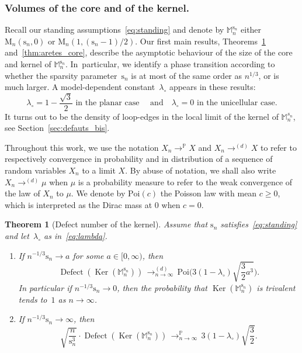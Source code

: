 \documentclass[11pt]{article}
\theoremstyle{plain}
\newtheorem{theorem}{Theorem}
\theoremstyle{definition}
\theoremstyle{remark}
\renewcommand{\P}{\mathbb{P}}
\newcommand{\Map}{\mathrm{M}}
\newcommand{\Mapb}{\mathbb{M}}
\newcommand{\spar}{\mathrm{s}}
\DeclareMathOperator{\Ker}{Ker}
\DeclareMathOperator{\Defect}{Defect}
\newcommand{\cvloi}[1][n]{\,\mathop{\longrightarrow}^{(d)}_{#1 \to \infty}\,}
\newcommand{\cvproba}[1][n]{\,\mathop{\longrightarrow}^{\P}_{#1 \to \infty}\,}
\begin{document}
\subsubsection*{Volumes of the core and of the kernel.}
Recall our standing assumptions~\eqref{eq:standing} and denote by $ \Mapb_{n}^{\spar_{n}}$ either $ \Map_{n}(\spar_{n},0)$ or $ \Map_{n}(1,(\spar_{n}-1)/2)$. Our first main results, Theorems~\ref{thm:defauts_ker} and~\ref{thm:aretes_core}, describe the asymptotic behaviour of the size of the core and kernel of $ \Mapb_{n}^{\spar_{n}}$. In~particular, we identify a phase transition according to whether the sparsity parameter~$\spar_{n}$ is at most of the same order as $n^{1/3}$, or is much larger.
A model-dependent constant~$\lambda_\circ$ appears in these results:
\begin{equation}\label{eq:lambda}
\lambda_\circ = 1-\frac{\sqrt{3}}{2}\text{ in the planar case }
\quad\text{and}\quad
\lambda_\circ = 0\text{ in the unicellular case}.
\end{equation}
It turns out to be the density of loop-edges in the local limit of the kernel of $ \Mapb_n^{s_n}$, see Section~\ref{sec:defauts_bis}.

Throughout this work, we use the notation $X_n \displaystyle\mathop{\to}^\P X$ and $X_n \displaystyle\mathop{\to}^{(d)} X$ to refer to respectively convergence in probability and in distribution of a sequence of random variables $X_n$ to a limit $X$. By abuse of notation, we shall also write $X_n \displaystyle\mathop{\to}^{(d)} \mu$ when $\mu$ is a probability measure to refer to the weak convergence of the law of $X_n$ to $\mu$.
We denote by $\mathrm{Poi}(c)$ the Poisson law with mean $c \ge 0$, which is interpreted as the Dirac mass at $0$ when $c=0$.

\begin{theorem}[Defect number of the kernel]
\label{thm:defauts_ker}
Assume that $\spar_n$ satisfies~\eqref{eq:standing} and let~$\lambda_\circ$ as in~\eqref{eq:lambda}.
\begin{enumerate}
\item\label{thm:defauts_ker-Poisson} If $n^{-1/3} \spar_n \to a$ for some $a \in [0,\infty)$, then
\[
\Defect(\Ker(\Mapb_n^{\spar_{n}})) \cvloi \mathrm{Poi} \biggl(3 (1-\lambda_{\circ}) \sqrt{\frac{3}{2} a^3} \biggr).
\]
In particular if $n^{-1/3} \spar_n \to 0$, then the probability that $\Ker(\Mapb_n^{\spar_{n}})$ is trivalent tends to~$1$ as $n \to \infty$.

\item\label{thm:defauts_ker-Gaussien} If $n^{-1/3} \spar_n \to \infty$, then
\[
\sqrt{\frac{n}{\spar_n^{3}}} \cdot \Defect(\Ker(\Mapb_n^{\spar_{n}})) \cvproba 3 (1-\lambda_{\circ}) \sqrt{\frac{3}{2}}.
\]
\end{enumerate}
\end{theorem}
\end{document}
